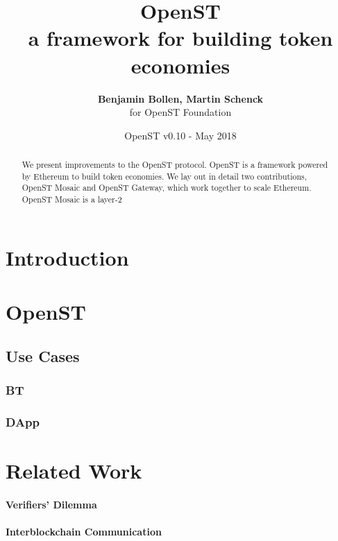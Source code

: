 \documentclass[12pt,a4paper]{article}
\title{OpenST\\\sc\Large{a framework for building token economies}}
\author{\textbf{Benjamin Bollen, Martin Schenck}\\ for OpenST Foundation}
\date{OpenST v0.10 - May 2018}
\begin{document}
\maketitle

\begin{abstract}
We present improvements to the OpenST protocol.
OpenST is a framework powered by Ethereum to build token economies.
We lay out in detail two contributions, OpenST Mosaic and OpenST Gateway,
which work together to scale Ethereum.
OpenST Mosaic is a layer-2
\end{abstract}

%
%
\section{Introduction}


%
%
\section{OpenST}

\subsection{Use Cases}

\subsubsection{BT}

\subsubsection{DApp}

%
%
\section{Related Work}

\paragraph{Verifiers' Dilemma}
\cite{verifiersdilemma}

\paragraph{Interblockchain Communication}
\cite{cosmos}
\end{document}
